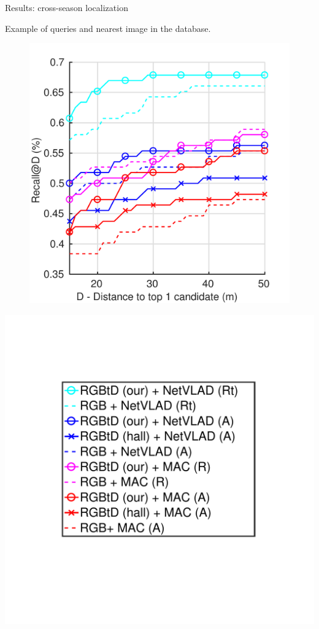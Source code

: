 \begin{frame}{Results: cross-season localization}
\begin{minipage}{0.27\linewidth}
			{\scriptsize Example of queries and nearest image in the database.}
	\end{minipage}\hfill
	\begin{minipage}{0.49\linewidth}
		\centering
		\begin{figure}
			\includegraphics[width=0.9\linewidth]{vect/res/snow}
		\end{figure}
	\end{minipage}\hfill
	\begin{minipage}{0.2\linewidth}
			\includegraphics[trim={90 140 95 100},clip,width=\linewidth]{vect/res/legend}	

\end{minipage}
\end{frame}
